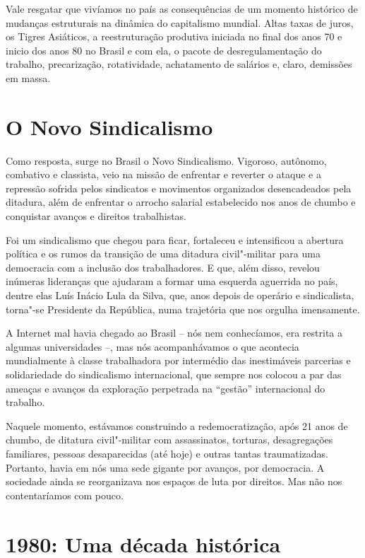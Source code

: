 Vale resgatar que vivíamos no país as consequências de um momento
histórico de mudanças estruturais na dinâmica do capitalismo mundial.
Altas taxas de juros, os Tigres Asiáticos, a reestruturação produtiva
iniciada no final dos anos 70 e inicio dos anos 80 no Brasil e com ela,
o pacote de desregulamentação do trabalho, precarização, rotatividade,
achatamento de salários e, claro, demissões em massa.

\section{O Novo Sindicalismo}

Como resposta, surge no Brasil o Novo Sindicalismo. Vigoroso, autônomo,
combativo e classista, veio na missão de enfrentar e reverter o
ataque e a repressão sofrida pelos sindicatos e movimentos organizados
desencadeados pela ditadura, além de enfrentar o arrocho salarial
estabelecido nos anos de chumbo e conquistar avanços e direitos
trabalhistas.

Foi um sindicalismo que chegou para ficar, fortaleceu e intensificou a
abertura política e os rumos da transição de uma ditadura civil"-militar
para uma democracia com a inclusão dos trabalhadores. E que, além disso, revelou
inúmeras lideranças que ajudaram a formar uma esquerda aguerrida no
país, dentre elas Luís Inácio Lula da Silva, que, anos depois de operário
e sindicalista, torna"-se Presidente da República, numa trajetória que
nos orgulha imensamente.

A Internet mal havia chegado ao Brasil -- nós nem conhecíamos, era
restrita a algumas universidades --, mas nós acompanhávamos o que acontecia
mundialmente à classe trabalhadora por intermédio das inestimáveis
parcerias e solidariedade do sindicalismo internacional, que sempre nos
colocou a par das ameaças e avanços da exploração perpetrada na
``gestão'' internacional do trabalho.

Naquele momento, estávamos construindo a redemocratização, após 21 anos
de chumbo, de ditatura civil"-militar com assassinatos, torturas,
desagregações familiares, pessoas desaparecidas (até hoje) e outras
tantas traumatizadas. Portanto, havia em nós uma sede gigante
por avanços, por democracia. A sociedade ainda se reorganizava nos
espaços de luta por direitos. Mas não nos contentaríamos com pouco.

\section{1980: Uma década histórica}

